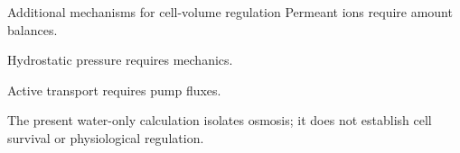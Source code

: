 \documentclass[aspectratio=169,11pt]{beamer}
\newcommand{\notestarget}{notes.pdf}\newcommand{\noteslabel}{Notes}
\begin{document}
\renewcommand{\notestarget}{notes.pdf\#note-limiting-cases-and-extension-to-volume-regulation}
\begin{frame}[t,fragile,label=slide-additional-mechanisms-for-cell-volume-regulation]{Additional mechanisms for cell-volume regulation}
Permeant ions require amount balances.\par Hydrostatic pressure requires mechanics.\par Active transport requires pump fluxes.\pause{}\par\medskip The present water-only calculation isolates osmosis; it does not establish cell survival or physiological regulation.
\end{frame}
\end{document}
